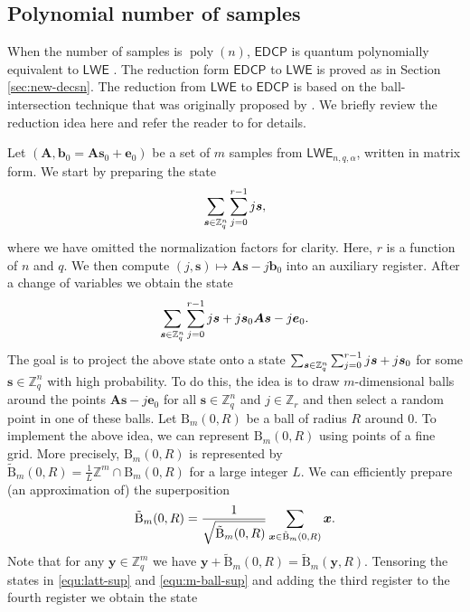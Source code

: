 \documentclass[11pt]{article}
\theoremstyle{plain}
\theoremstyle{definition}
\DeclareMathOperator{\poly}{poly}
\let\ket\relax
\DeclarePairedDelimiter{\ket}{\lvert}{\rangle}
\def\Z{\mathbb{Z}}
\def\lwe{\mathsf{LWE}}
\def\edcp{\mathsf{EDCP}}
\begin{document}
\subsection{Polynomial number of samples}
\label{sec:hardness-poly}

When the number of samples is $\poly(n)$, $\edcp$ is quantum polynomially equivalent to $\lwe$ \cite{brakerski2018learning}. The reduction form $\edcp$ to $\lwe$ is proved as in Section \ref{sec:new-decsn}. The reduction from $\lwe$ to $\edcp$ is based on the ball-intersection technique that was originally proposed by \cite{regev2004quantum}. We briefly review the reduction idea here and refer the reader to \cite{regev2004quantum, brakerski2018learning} for details.

Let $(\bm{A}, \bm{b}_0 = \bm{As}_0 + \bm{e}_0)$ be a set of $m$ samples from $\lwe_{n, q, \alpha}$, written in matrix form. We start by preparing the state 
\[ \sum_{\bm{s} \in \Z_q^n} \sum_{j = 0}^{r - 1} \ket{j}\ket{\bm{s}}, \]
where we have omitted the normalization factors for clarity. Here, $r$ is a function of $n$ and $q$. We then compute $(j, \bm{s}) \mapsto \bm{As} - j\bm{b}_0$ into an auxiliary register. After a change of variables we obtain the state
\begin{equation}
    \label{equ:latt-sup}
    \sum_{\bm{s} \in \Z_q^n} \sum_{j = 0}^{r - 1} \ket{j}\ket{\bm{s} + j\bm{s}_0}\ket{\bm{As} - j\bm{e}_0}.
\end{equation}
The goal is to project the above state onto a state $\sum_{\bm{s} \in \Z_q^n} \sum_{j = 0}^{r - 1} \ket{j}\ket{\bm{s} + j\bm{s}_0}$ for some $\bm{s} \in \Z_q^n$ with high probability. To do this, the idea is to draw $m$-dimensional balls around the points $\bm{As} - j\bm{e}_0$ for all $\bm{s} \in \Z_q^n$ and $j \in \Z_r$ and then select a random point in one of these balls. Let $\mathrm{B}_m(0, R)$ be a ball of radius $R$ around $0$. To implement the above idea, we can represent $\mathrm{B}_m(0, R)$ using points of a fine grid. More precisely, $\mathrm{B}_m(0, R)$ is represented by $\tilde{\mathrm{B}}_m(0, R) = \frac{1}{L} \Z^m \cap \mathrm{B}_m(0, R)$ for a large integer $L$. We can efficiently prepare (an approximation of) the superposition
\begin{equation}
    \label{equ:m-ball-sup}
    \ket{\tilde{\mathrm{B}}_m(0, R)} = \frac{1}{\sqrt{\tilde{\mathrm{B}}_m(0, R)}} \sum_{\bm{x} \in \tilde{\mathrm{B}}_m(0, R)} \ket{\bm{x}}.
\end{equation}
Note that for any $\bm{y} \in \Z_q^m$ we have $\bm{y} + \tilde{\mathrm{B}}_m(0, R) = \tilde{\mathrm{B}}_m(\bm{y}, R)$. Tensoring the states in \eqref{equ:latt-sup} and \eqref{equ:m-ball-sup} and adding the third register to the fourth register we obtain the state
\end{document}
